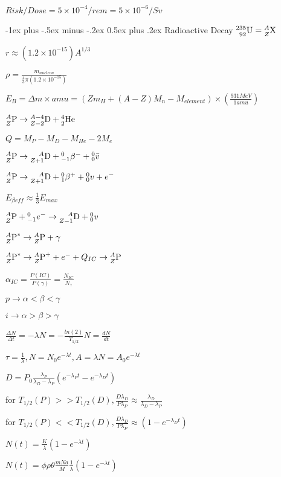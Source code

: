 \documentclass[12pt,landscape]{article}
\makeatletter
\newcommand{\nucl}[3]{
\ensuremath{
\phantom{\ensuremath{^{#1}_{#2}}}
\llap{\ensuremath{^{#1}}}
\llap{\ensuremath{_{\rule{0pt}{.75em}#2}}}
\mbox{#3}
}
}
\renewcommand{\section}{\@startsection{section}{1}{0mm}%
                                {-1ex plus -.5ex minus -.2ex}%
                                {0.5ex plus .2ex}%
                                {\normalfont\large\bfseries}}
\makeatother
\begin{document}
\begin{multicols}{4}
$Risk/Dose = 5 \times 10^{-4}/rem = 5\times 10^{-6}/Sv$

\section{Radioactive Decay}
$\nucl{235}{92}{U} = \nucl{A}{Z}{X}$

$r \approx (1.2\times 10^{-15})A^{1/3}$

$\rho = \frac{m_{nucleon}}{\frac{4}{3}\pi(1.2\times 10^{-15})}$

$E_{B} = \Delta m \times amu = (Zm_{H}+(A-Z)M_{n}-M_{element})\times
(\frac{931MeV}{1 amu}) $

$\nucl{A}{Z}{P} \rightarrow \nucl{A-4}{Z-2}{D} + \nucl{4}{2}{He}$

$Q = M_{P}-M_{D}-M_{He}-2M_{e}$

$\nucl{A}{Z}{P} \rightarrow \nucl{A}{Z+1}{D}+
{}^{0}_{-1}\beta^-+{}^{0}_{0}\bar{v}$

$\nucl{A}{Z}{P} \rightarrow \nucl{A}{Z+1}{D}+
{}^{0}_{1}\beta^++{}^{0}_{0}v + e^-$

$E_{\beta eff} \approx \frac{1}{3}E_{max}$

$\nucl{A}{Z}{P} + {}^{0}_{-1}e^- \rightarrow \nucl{A}{Z-1}{D} + {}^{0}_{0}v$

$\nucl{A}{Z}{P}^* \rightarrow \nucl{A}{Z}{P} + \gamma$

$\nucl{A}{Z}{P}^*\rightarrow \nucl{A}{Z}{P}^+ + e^- +Q_{IC} \rightarrow
\nucl{A}{Z}{P}$

$\alpha_{IC} = \frac{P(IC)}{P(\gamma)} = \frac{N_{IC}}{N_{\gamma}}$

$p \rightarrow \alpha<\beta<\gamma $

$i \rightarrow \alpha>\beta>\gamma$

$\frac{\Delta N}{\Delta t} = -\lambda N = -\frac{ln(2)}{T_{1/2}}N =
\frac{dN}{dt}$

$\tau = \frac{1}{\lambda}, N = N_0e^{-\lambda t}, A = \lambda N = A_0e^{-\lambda
t}$

$D = P_0\frac{\lambda_P}{\lambda_D - \lambda_P}(e^{-\lambda_P
t}-e^{-\lambda_D t})$

for
$T_{1/2}(P)>>T_{1/2}(D),\frac{D\lambda_D}{P\lambda_P}\approx\frac{\lambda_D}{\lambda_D-\lambda_P}$

for
$T_{1/2}(P)<<T_{1/2}(D),\frac{D\lambda_D}{P\lambda_P}\approx
(1-e^{-\lambda_Dt})$

$N(t) = \frac{K}{\lambda}(1-e^{-\lambda t})$

$N(t) = \phi\rho\theta\frac{mNa}{M}\frac{1}{\lambda}(1-e^{-\lambda t})$


\end{multicols}
\end{document}
